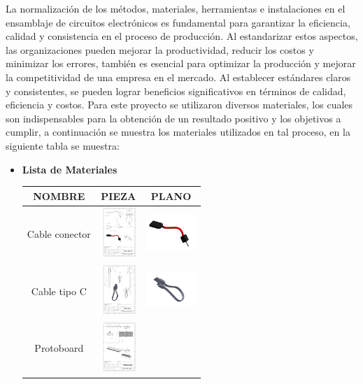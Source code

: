     La normalización de los métodos, materiales, herramientas e instalaciones en el ensamblaje de circuitos electrónicos es fundamental para garantizar la eficiencia, calidad y consistencia en el proceso de producción. Al estandarizar estos aspectos, las organizaciones pueden mejorar la productividad, reducir los costos y minimizar los errores, también es esencial para optimizar la producción y mejorar la competitividad de una empresa en el mercado. Al establecer estándares claros y consistentes, se pueden lograr beneficios significativos en términos de calidad, eficiencia y costos.
    Para este proyecto se utilizaron diversos materiales, los
    cuales son indispensables para la obtención de un resultado positivo y los objetivos a cumplir, a continuación se muestra los materiales utilizados en tal proceso, en la siguiente tabla se muestra:
    \begin{itemize}
    \item \textbf{Lista de Materiales}  
    \begin{table} [H] 
      \huge
      \tiny 
      \begin{tabular}   {| c |  c |  c | }
      \hline
      NOMBRE & PIEZA  & PLANO \\
      \hline 
      Cable conector &  \includegraphics[height=19mm]{1/img/cable conetor.pdf}  & 
       \includegraphics[width=19mm]{1/img/cable conetor_1.pdf} \\
        \hline
        Cable tipo C &  \includegraphics[height=19mm]{1/img/Cable tipo C.pdf}  & 
       \includegraphics[width=19mm]{1/img/Cable tipo C_1.pdf} \\
        \hline
      Protoboard &  \includegraphics[height=19mm]{1/img/Protoboard.pdf}  & 

\end{tabular}
\end{table}
\end{itemize}
